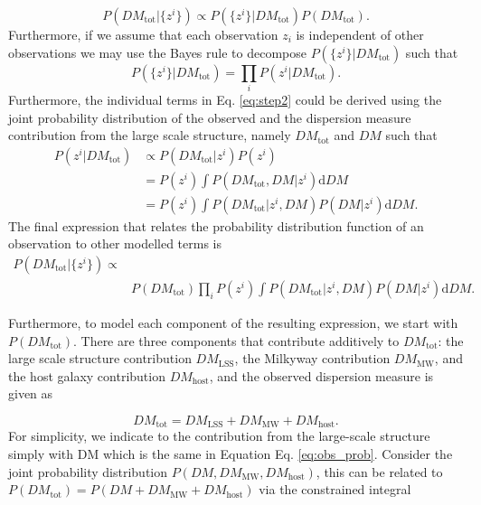 \begin{equation}
P(DM_\text{tot}|\{z^i\}) \propto P(\{z^i\}|DM_\text{tot}) P(DM_\text{tot}).
\end{equation}
Furthermore, if we assume that each observation $z_i$ is independent of other observations we may use the Bayes rule to decompose $P(\{z^i\}|DM_\text{tot})$ such that
\begin{equation} \label{eq:step2}
    P(\{z^i\}|DM_\text{tot}) = \prod_{i}P(z^i|DM_\text{tot}).
\end{equation}
Furthermore, the individual terms in Eq. \ref{eq:step2} could be derived using the joint probability distribution of the observed and the dispersion measure contribution from the large scale structure, namely $DM_\text{tot}$ and $DM$ such that
\begin{equation}
    \begin{split}
    P(z^i|DM_\text{tot}) & \propto P(DM_\text{tot}|z^i) P(z^i) \\
                    & = P(z^i) \int P(DM_\text{tot}, DM|z^i)\mathrm{d}DM \\
                    & = P(z^i) \int P(DM_\text{tot}|z^i, DM) P(DM|z^i)\mathrm{d}DM.
    \end{split}
\end{equation}
The final expression that relates the probability distribution function of an observation to other modelled terms is 
\begin{equation} \label{eq:obs_prob}
\begin{split}
    P(DM_\text{tot}|\{z^i\}) \propto & \\
    & P(DM_\text{tot}) \prod_{i}P(z^i) \int P(DM_\text{tot}|z^i, DM) P(DM|z^i)\mathrm{d}DM.
\end{split}
\end{equation}

Furthermore, to model each component of the resulting expression, we start with $P(DM_\text{tot})$. There are three components that contribute additively to $DM_\text{tot}$: the large scale structure contribution $DM_{\text{LSS}}$, the Milkyway contribution $DM_{\text{MW}}$, and the host galaxy contribution $DM_{\text{host}}$, and the observed dispersion measure is given as

\begin{equation}
    DM_\text{tot} = DM_{\text{LSS}} + DM_{\text{MW}} + DM_{\text{host}}.
\end{equation}
For simplicity, we indicate to the contribution from the large-scale structure simply with $\mathrm{DM}$ which is the same in Equation Eq. \ref{eq:obs_prob}. Consider the joint probability distribution $P(DM, DM_{\text{MW}},  DM_{\text{host}})$, this can be related to $P(DM_\text{tot}) = P(DM + DM_{\text{MW}} + DM_{\text{host}})$ via the constrained integral

